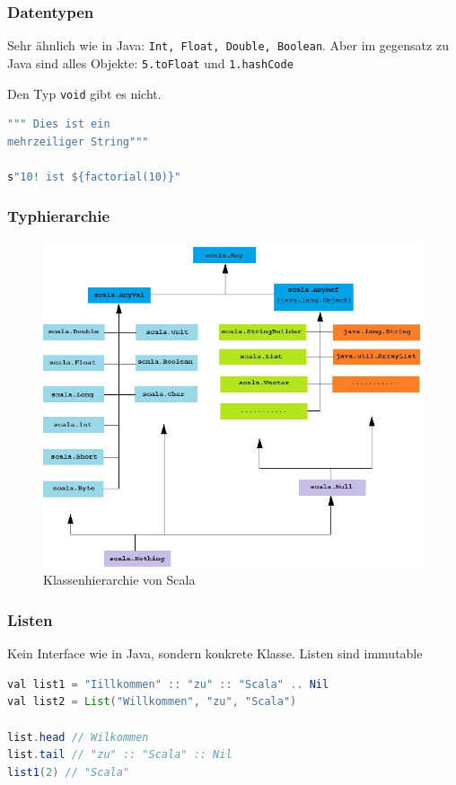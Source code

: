 \subsubsection{Datentypen}
Sehr ähnlich wie in Java: \lstinline|Int, Float, Double, Boolean|. Aber im gegensatz zu Java sind alles Objekte: \lstinline|5.toFloat| und \lstinline|1.hashCode|

Den Typ \lstinline|void| gibt  es nicht.

\begin{lstlisting}[language=java]
""" Dies ist ein
mehrzeiliger String"""

s"10! ist ${factorial(10)}"
\end{lstlisting}

\subsubsection{Typhierarchie}

\begin{figure}[h!]
\centering
\includegraphics[width=0.7\linewidth]{images/scala_klassenhierachy}
\caption{Klassenhierarchie von Scala}
\label{fig:scalaklassenhierachy}
\end{figure}



\subsubsection{Listen}

Kein Interface wie in Java, sondern konkrete Klasse. Listen sind immutable

\begin{lstlisting}[language=java]
val list1 = "Iillkommen" :: "zu" :: "Scala" .. Nil
val list2 = List("Willkommen", "zu", "Scala")

list.head // Wilkommen
list.tail // "zu" :: "Scala" :: Nil
list1(2) // "Scala"
\end{lstlisting}

